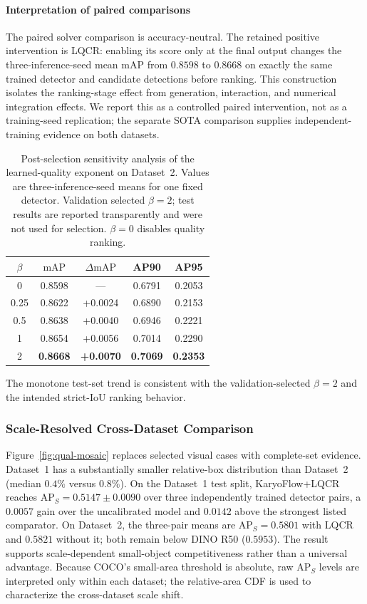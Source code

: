 \documentclass[journal,10pt]{IEEEtran}
\theoremstyle{definition}
\newcommand{\mAP}{\ensuremath{\mathrm{mAP}}}
\begin{document}
\paragraph{Interpretation of paired comparisons}
The paired solver comparison is accuracy-neutral. The retained
positive intervention is LQCR: enabling its score only at the
final output changes the three-inference-seed mean mAP from $0.8598$ to $0.8668$ on exactly the same
trained detector and candidate detections before ranking. This construction isolates
the ranking-stage effect from generation, interaction, and numerical
integration effects. We report this as a controlled paired intervention,
not as a training-seed replication; the separate SOTA comparison supplies
independent-training evidence on both datasets.

\begin{table}[t]
  \centering
  \caption{Post-selection sensitivity analysis of the learned-quality exponent
  on Dataset~2. Values are three-inference-seed means for one fixed detector.
  Validation selected $\beta=2$; test results are reported transparently and
  were not used for selection. $\beta=0$ disables quality ranking.}
  \label{tab:lqcr-beta}
  \setlength{\tabcolsep}{4pt}
  \begin{tabular}{c|cccc}
    \toprule
    $\beta$ & \mAP{} & $\Delta$\mAP{} & AP90 & AP95 \\
    \midrule
    0      & 0.8598 & ---     & 0.6791 & 0.2053 \\
    0.25 & 0.8622 & +0.0024 & 0.6890 & 0.2153 \\
    0.5 & 0.8638 & +0.0040 & 0.6946 & 0.2221 \\
    1      & 0.8654 & +0.0056 & 0.7014 & 0.2290 \\
    2      & \textbf{0.8668} & \textbf{+0.0070} & \textbf{0.7069} & \textbf{0.2353} \\
    \bottomrule
  \end{tabular}
\end{table}
The monotone test-set trend is consistent with the validation-selected
$\beta=2$ and the intended strict-IoU ranking behavior.

\subsubsection{Scale-Resolved Cross-Dataset Comparison}\label{sec:exp-qual}
Figure~\ref{fig:qual-mosaic} replaces selected visual cases with complete-set
evidence. Dataset~1 has a substantially smaller relative-box distribution than
Dataset~2 (median $0.4\%$ versus $0.8\%$). On the Dataset~1 test split,
KaryoFlow+LQCR reaches AP$_S=0.5147\pm0.0090$ over three independently trained
detector pairs, a $0.0057$
gain over the uncalibrated model and $0.0142$ above the strongest listed
comparator. On Dataset~2, the three-pair means are AP$_S=0.5801$ with LQCR
and $0.5821$ without it; both remain below DINO R50 ($0.5953$). The result supports scale-dependent small-object
competitiveness rather than a universal advantage. Because COCO's small-area threshold is absolute, raw
AP$_S$ levels are interpreted only within each dataset; the relative-area CDF
is used to characterize the cross-dataset scale shift.
\end{document}
